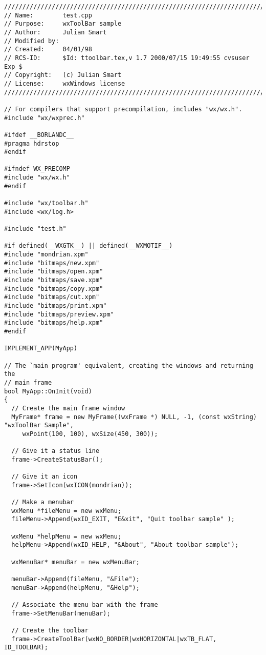 {\small
\begin{verbatim}
/////////////////////////////////////////////////////////////////////////////
// Name:        test.cpp
// Purpose:     wxToolBar sample
// Author:      Julian Smart
// Modified by:
// Created:     04/01/98
// RCS-ID:      $Id: ttoolbar.tex,v 1.7 2000/07/15 19:49:55 cvsuser Exp $
// Copyright:   (c) Julian Smart
// License:   	wxWindows license
/////////////////////////////////////////////////////////////////////////////

// For compilers that support precompilation, includes "wx/wx.h".
#include "wx/wxprec.h"

#ifdef __BORLANDC__
#pragma hdrstop
#endif

#ifndef WX_PRECOMP
#include "wx/wx.h"
#endif

#include "wx/toolbar.h"
#include <wx/log.h>

#include "test.h"

#if defined(__WXGTK__) || defined(__WXMOTIF__)
#include "mondrian.xpm"
#include "bitmaps/new.xpm"
#include "bitmaps/open.xpm"
#include "bitmaps/save.xpm"
#include "bitmaps/copy.xpm"
#include "bitmaps/cut.xpm"
#include "bitmaps/print.xpm"
#include "bitmaps/preview.xpm"
#include "bitmaps/help.xpm"
#endif

IMPLEMENT_APP(MyApp)

// The `main program' equivalent, creating the windows and returning the
// main frame
bool MyApp::OnInit(void)
{
  // Create the main frame window
  MyFrame* frame = new MyFrame((wxFrame *) NULL, -1, (const wxString) "wxToolBar Sample",
     wxPoint(100, 100), wxSize(450, 300));

  // Give it a status line
  frame->CreateStatusBar();

  // Give it an icon
  frame->SetIcon(wxICON(mondrian));

  // Make a menubar
  wxMenu *fileMenu = new wxMenu;
  fileMenu->Append(wxID_EXIT, "E&xit", "Quit toolbar sample" );

  wxMenu *helpMenu = new wxMenu;
  helpMenu->Append(wxID_HELP, "&About", "About toolbar sample");

  wxMenuBar* menuBar = new wxMenuBar;

  menuBar->Append(fileMenu, "&File");
  menuBar->Append(helpMenu, "&Help");

  // Associate the menu bar with the frame
  frame->SetMenuBar(menuBar);

  // Create the toolbar
  frame->CreateToolBar(wxNO_BORDER|wxHORIZONTAL|wxTB_FLAT, ID_TOOLBAR);
  

\end{verbatim}}
